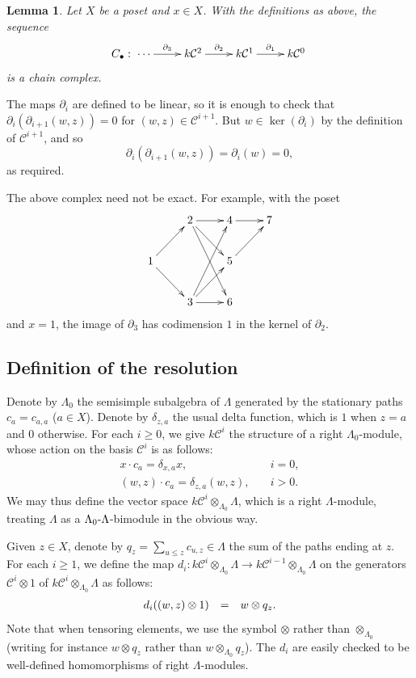 \documentclass[preprint,review,12pt]{elsarticle}
\newcommand{\C}{{\mathcal C}}
\newtheorem{lema}[teo]{Lemma}
\begin{document}
\begin{lema}\label{lema1}
Let $X$ be a poset and $x\in X$.  With the definitions as above, the sequence 
	$$C_{\bullet}: \xymatrix@R=0.8em{ \cdots \ar[r]^-{\partial_3} & k\C^2 \ar[r]^-{\partial_2} & k\C^{1} \ar[r]^-{\partial_{1}} & k\C^{0}}$$
is a chain complex.
\end{lema}
\begin{pf}
The maps $\partial_i$ are defined to be linear, so it is enough to check that $\partial_i(\partial_{i+1}(w,z)) = 0$ for $(w,z)\in \mathcal{C}^{i+1}$.  But $w\in \ker(\partial_i)$ by the definition of $\mathcal{C}^{i+1}$, and so
$$\partial_i(\partial_{i+1}(w,z)) = \partial_i(w) = 0,$$
as required.
\end{pf}
The above complex need not be exact.  For example, with the poset
	$$\xymatrix{ & 2\ar[r]\ar[rd]\ar[rdd] & 4\ar[r] & 7  \\ 1\ar[rd]\ar[ru]& & 5\ar[ru] &   \\
	& 3\ar[ruu]\ar[ru]\ar[r] & 6 &  }$$
and $x=1$, the image of $\partial_3$ has codimension $1$ in the kernel of $\partial_2$.

\subsection{Definition of the resolution}\label{subsec resolution def}
Denote by $\Lambda_0$ the semisimple subalgebra of $\Lambda$ generated by the stationary paths $c_a = c_{a,a}$ ($a\in X$).  Denote by $\delta_{z,a}$ the usual delta function, which is $1$ when $z=a$ and $0$ otherwise.  For each $i\geqslant 0$, we give $k\C^i$ the structure of a right $\Lambda_0$-module, whose action on the basis $\C^i$ is as follows: 
\begin{align*}
x\cdot c_a = \delta_{x,a}x, & \quad i=0, \\
(w,z)\cdot c_a = \delta_{z,a}(w,z),& \quad i> 0.
\end{align*}
We may thus define the vector space $k\C^i\otimes_{\Lambda_0}\Lambda$, which is a right $\Lambda$-module, treating $\Lambda$ as a $\Lambda_0\hbox{-}\Lambda$-bimodule in the obvious way.

Given $z\in X$, denote by $q_z = \sum_{u\leqslant z}c_{u,z}\in \Lambda$ the sum of the paths ending at $z$.  For each $i\geqslant 1$, we define the map
$d_i: k\C^i\otimes_{\Lambda_0}\Lambda\longrightarrow k\C^{i-1}\otimes_{\Lambda_0}\Lambda$ on the generators $\C^i\otimes 1$ of $k\C^i\otimes_{\Lambda_0}\Lambda$ as follows:
	$$\begin{array}{c c l}
	d_i((w,z)\otimes 1)&=&w\otimes q_z.
	\end{array}$$
Note that when tensoring elements, we use the symbol $\otimes$ rather than $\otimes_{\Lambda_0}$ (writing for instance $w\otimes q_z$ rather than $w\otimes_{\Lambda_0} q_z$).  The $d_i$ are easily checked to be well-defined homomorphisms of right $\Lambda$-modules.  
\end{document}
